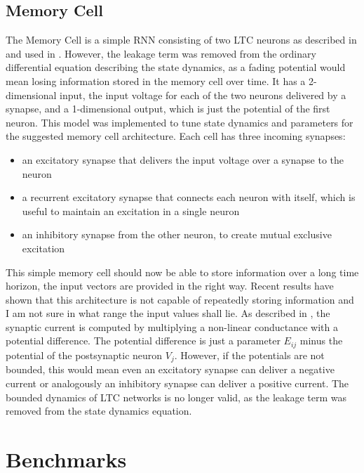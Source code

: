 \documentclass[draft,final]{vutinfth} %
\begin{document}
    \section{Memory Cell} \label{memory_cell}
    The Memory Cell is a simple RNN consisting of two LTC neurons as described in \cite{LTCNetworks} and used in \cite{NCP}.
    However, the leakage term was removed from the ordinary differential equation describing the state dynamics, as a fading potential would mean losing information stored in the memory cell over time.
    It has a 2-dimensional input, the input voltage for each of the two neurons delivered by a synapse, and a 1-dimensional output, which is just the potential of the first neuron.
    This model was implemented to tune state dynamics and parameters for the suggested memory cell architecture.
    Each cell has three incoming synapses:
    \begin{itemize}
        \item{}
        an excitatory synapse that delivers the input voltage over a synapse to the neuron
        \item{}
        a recurrent excitatory synapse that connects each neuron with itself, which is useful to maintain an excitation in a single neuron
        \item{}
        an inhibitory synapse from the other neuron, to create mutual exclusive excitation
    \end{itemize}
    This simple memory cell should now be able to store information over a long time horizon, the input vectors are provided in the right way.
    Recent results have shown that this architecture is not capable of repeatedly storing information and I am not sure in what range the input values shall lie.
    As described in \cite{LTCNetworks}, the synaptic current is computed by multiplying a non-linear conductance with a potential difference.
    The potential difference is just a parameter $E_{ij}$ minus the potential of the postsynaptic neuron $V_j$.
    However, if the potentials are not bounded, this would mean even an excitatory synapse can deliver a negative current or analogously an inhibitory synapse can deliver a positive current.
    The bounded dynamics of LTC networks is no longer valid, as the leakage term was removed from the state dynamics equation.

    \chapter{Benchmarks}
\end{document}
